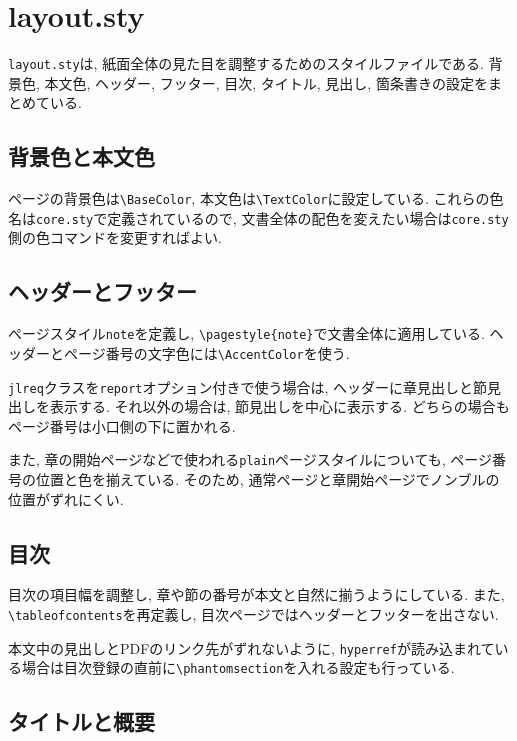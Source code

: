 \documentclass[../main.tex]{subfiles}
\begin{document}
\section{layout.sty}

\texttt{layout.sty}は, 紙面全体の見た目を調整するためのスタイルファイルである. 
背景色, 本文色, ヘッダー, フッター, 目次, タイトル, 見出し, 箇条書きの設定をまとめている. 

\subsection{背景色と本文色}

ページの背景色は\verb|\BaseColor|, 本文色は\verb|\TextColor|に設定している. 
これらの色名は\texttt{core.sty}で定義されているので, 文書全体の配色を変えたい場合は\texttt{core.sty}側の色コマンドを変更すればよい. 

\subsection{ヘッダーとフッター}

ページスタイル\texttt{note}を定義し, \verb|\pagestyle{note}|で文書全体に適用している. 
ヘッダーとページ番号の文字色には\verb|\AccentColor|を使う. 

\texttt{jlreq}クラスを\texttt{report}オプション付きで使う場合は, ヘッダーに章見出しと節見出しを表示する. 
それ以外の場合は, 節見出しを中心に表示する. 
どちらの場合もページ番号は小口側の下に置かれる. 

また, 章の開始ページなどで使われる\texttt{plain}ページスタイルについても, ページ番号の位置と色を揃えている. 
そのため, 通常ページと章開始ページでノンブルの位置がずれにくい. 

\subsection{目次}

目次の項目幅を調整し, 章や節の番号が本文と自然に揃うようにしている. 
また, \verb|\tableofcontents|を再定義し, 目次ページではヘッダーとフッターを出さない. 

本文中の見出しとPDFのリンク先がずれないように, \texttt{hyperref}が読み込まれている場合は目次登録の直前に\verb|\phantomsection|を入れる設定も行っている. 

\subsection{タイトルと概要}
\end{document}
